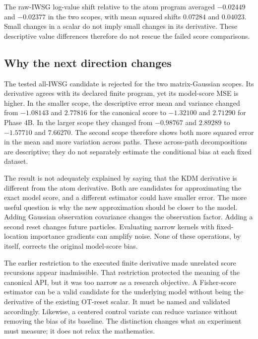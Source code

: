 \documentclass[11pt]{article}
\begin{document}
The raw-IWSG log-value shift relative to the atom program averaged
$-0.02449$ and $-0.02377$ in the two scopes, with mean squared shifts
$0.07284$ and $0.04023$. Small changes in a scalar do not imply small changes
in its derivative. These descriptive value differences therefore do not
rescue the failed score comparisons.

\subsection{Why the next direction changes}
\label{sec:pivot}

The tested all-IWSG candidate is rejected for the two matrix-Gaussian scopes.
Its derivative agrees with its declared finite program, yet its model-score
MSE is higher. In the smaller scope, the descriptive error mean and variance
changed from $-1.08143$ and $2.77816$ for the canonical score to $-1.32100$
and $2.71290$ for Phase 4B. In the larger scope they changed from $-0.98767$
and $2.89289$ to $-1.57710$ and $7.66270$. The second scope therefore shows
both more squared error in the mean and more variation across paths. These
across-path decompositions are descriptive; they do not separately estimate
the conditional bias at each fixed dataset.

The result is not adequately explained by saying that the KDM derivative is
different from the atom derivative. Both are candidates for approximating
the exact model score, and a different estimator could have smaller error.
The more useful question is why the new approximation should be closer to
the model. Adding Gaussian observation covariance changes the observation
factor. Adding a second reset changes future particles. Evaluating narrow
kernels with fixed-location importance gradients can amplify noise. None of
these operations, by itself, corrects the original model-score bias.

The earlier restriction to the executed finite derivative made unrelated
score recursions appear inadmissible. That restriction protected the meaning
of the canonical API, but it was too narrow as a research objective. A
Fisher-score estimator can be a valid candidate for the underlying model
without being the derivative of the existing OT-reset scalar. It must be
named and validated accordingly. Likewise, a centered control variate can
reduce variance without removing the bias of its baseline. The distinction
changes what an experiment must measure; it does not relax the mathematics.
\end{document}
